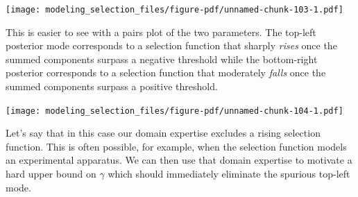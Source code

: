 \documentclass[
  letterpaper,
  DIV=11,
  numbers=noendperiod]{scrartcl}
\newenvironment{Shaded}{\begin{snugshade}}{\end{snugshade}}
\newcommand{\FunctionTok}[1]{\textcolor[rgb]{0.28,0.35,0.67}{#1}}
\newcommand{\NormalTok}[1]{\textcolor[rgb]{0.00,0.23,0.31}{#1}}
\newcommand{\SpecialCharTok}[1]{\textcolor[rgb]{0.37,0.37,0.37}{#1}}
\newcommand{\StringTok}[1]{\textcolor[rgb]{0.13,0.47,0.30}{#1}}
\begin{document}
\texttt{[image: modeling\_selection\_files/figure-pdf/unnamed-chunk-103-1.pdf]}

This is easier to see with a pairs plot of the two parameters. The
top-left posterior mode corresponds to a selection function that sharply
\emph{rises} once the summed components surpass a negative threshold
while the bottom-right posterior corresponds to a selection function
that moderately \emph{falls} once the summed components surpass a
positive threshold.

\begin{Shaded}
\end{Shaded}

\texttt{[image: modeling\_selection\_files/figure-pdf/unnamed-chunk-104-1.pdf]}

Let's say that in this case our domain expertise excludes a rising
selection function. This is often possible, for example, when the
selection function models an experimental apparatus. We can then use
that domain expertise to motivate a hard upper bound on \(\gamma\) which
should immediately eliminate the spurious top-left mode.
\end{document}
